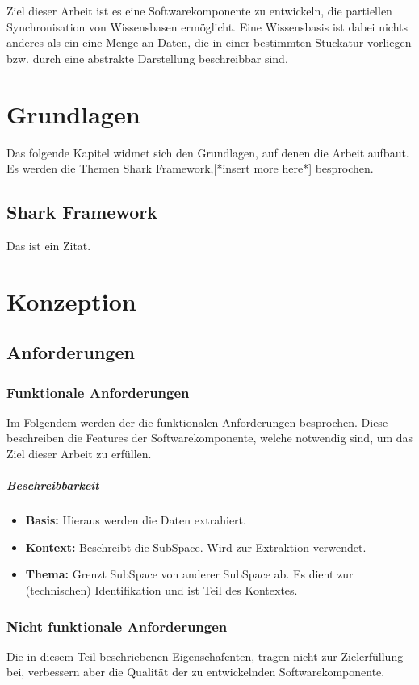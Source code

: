 \documentclass[a4paper]{article}
\begin{document}
	Ziel dieser Arbeit ist es eine Softwarekomponente zu entwickeln, die 
	partiellen Synchronisation von Wissensbasen ermöglicht. Eine Wissensbasis
	ist dabei nichts anderes als ein eine Menge an Daten, die in einer
	bestimmten Stuckatur vorliegen bzw. durch eine abstrakte Darstellung
	beschreibbar sind. 
	
	\section{Grundlagen}	
	
	Das folgende Kapitel widmet sich den Grundlagen, auf denen die Arbeit
	aufbaut. Es werden die Themen Shark Framework,[*insert more here*]
	besprochen.
	
	\subsection{Shark Framework}
	
	Das ist ein Zitat. \cite{SharkFW}
	
	
	\section{Konzeption}	
	
	\subsection{Anforderungen}
	
	\subsubsection{Funktionale Anforderungen}
	
	Im Folgendem werden der die funktionalen Anforderungen besprochen. Diese
	beschreiben die Features der Softwarekomponente, welche notwendig sind,
	um das Ziel dieser Arbeit zu erfüllen.
	
	\subparagraph{Beschreibbarkeit}
	
	\begin{itemize}
		\item \textbf{Basis:} Hieraus werden die Daten extrahiert.
		\item \textbf{Kontext:} Beschreibt die SubSpace. Wird zur Extraktion
			  verwendet.
		\item \textbf{Thema:} Grenzt SubSpace von anderer SubSpace ab. Es dient 				  zur (technischen) Identifikation und ist Teil des Kontextes.
	\end{itemize} 	
	
	\subsubsection{Nicht funktionale Anforderungen}
	
	Die in diesem Teil beschriebenen Eigenschafenten, tragen nicht zur
	Zielerfüllung bei, verbessern aber die Qualität der zu entwickelnden
	Softwarekomponente.
	
	\newpage
	\printbibliography[type=online,heading=subbibliography,title={Webseiten}]
	\newpage
	\listoffigures
	\newpage
	\listoftables
\end{document}
